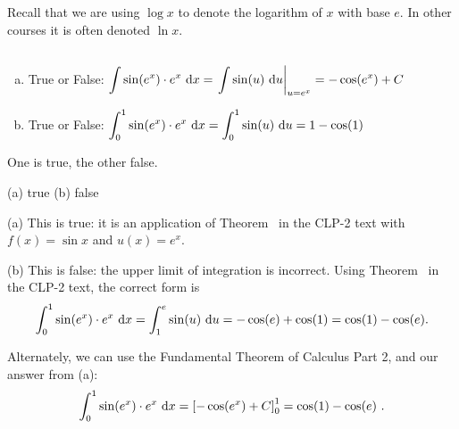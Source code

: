 %
%

\noindent
Recall that we are using $\log x$ to denote the logarithm of $x$ with
base $e$. In other courses it is often denoted $\ln x$.


\subsection*{\Conceptual}
\begin{Mquestion}\label{1.4_intbounds}
\begin{enumerate}[(a)]
\item True or False: $\displaystyle\int \sin(e^x)\cdot e^x\ \mathrm{d}x = \left.\displaystyle\int \sin(u)\ \mathrm{d}u\right|_{u=e^x} = -\cos(e^x)+C$
\item True or False: $\displaystyle\int_0^1 \sin(e^x)\cdot e^x\ \mathrm{d}x = \displaystyle\int_0^1 \sin(u)\ \mathrm{d}u = 1-\cos(1)$
\end{enumerate}
\end{Mquestion}
\begin{hint}
One is true, the other false.
\end{hint}
\begin{answer}
(a) true \qquad (b) false
\end{answer}
\begin{solution}
(a) This is true: it is an application of Theorem~ in the CLP-2 text with $f(x)=\sin x$ and $u(x)=e^x$.

(b) This is false: the upper limit of integration is incorrect. Using
Theorem~ in the CLP-2 text, the correct form
is \[\displaystyle\int_0^1 \sin(e^x)\cdot e^x\ \mathrm{d}x = \displaystyle\int_1^{e} \sin(u)\ \mathrm{d}u = -\cos(e) + \cos(1)
= \cos(1)-\cos(e).\]

Alternately, we can use the Fundamental Theorem of Calculus Part 2, and our answer from (a):
\[\int_0^1 \sin(e^x)\cdot e^x\ \mathrm{d}x=\left[-\cos(e^x)+C\right]_{0}^1 = \cos(1)-\cos(e)\ .\]
\end{solution}


